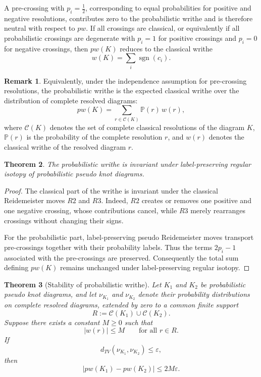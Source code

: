 \documentclass[a4paper, reqno, 12pt]{amsart}
\theoremstyle{plain}
\newtheorem{theorem}{Theorem}[section]
\theoremstyle{definition}
\newtheorem{remark}[theorem]{Remark}
\begin{document}
A pre-crossing with \(p_i=\frac12\), corresponding to equal probabilities for positive and negative resolutions, contributes zero to the probabilistic writhe and is therefore neutral with respect to \(pw\). If all crossings are classical, or equivalently if all probabilistic crossings are degenerate with \(p_i=1\) for positive crossings and \(p_i=0\) for negative crossings, then \(pw(K)\) reduces to the classical writhe
\[
w(K)=\sum_i \operatorname{sgn}(c_i).
\]

\begin{remark}
Equivalently, under the independence assumption for pre-crossing resolutions, the probabilistic writhe is the expected classical writhe over the distribution of complete resolved diagrams:
\[
pw(K)
=
\sum_{r\in\mathcal C(K)}
\mathbb P(r)\,w(r),
\]
where \(\mathcal C(K)\) denotes the set of complete classical resolutions of the diagram \(K\), \(\mathbb P(r)\) is the probability of the complete resolution \(r\), and \(w(r)\) denotes the classical writhe of the resolved diagram \(r\).\end{remark}

\begin{theorem}\label{pwinv}
The probabilistic writhe is invariant under label-preserving regular isotopy of probabilistic pseudo knot diagrams.
\end{theorem}

\begin{proof}
The classical part of the writhe is invariant under the classical Reidemeister moves \(R2\) and \(R3\). Indeed, \(R2\) creates or removes one positive and one negative crossing, whose contributions cancel, while \(R3\) merely rearranges crossings without changing their signs.

For the probabilistic part, label-preserving pseudo Reidemeister moves transport pre-crossings together with their probability labels. Thus the terms \(2p_i-1\) associated with the pre-crossings are preserved. Consequently the total sum defining \(pw(K)\) remains unchanged under label-preserving regular isotopy.
\end{proof}



\begin{theorem}[Stability of probabilistic writhe]
Let \(K_1\) and \(K_2\) be probabilistic pseudo knot diagrams, and let \(\nu_{K_1}\) and \(\nu_{K_2}\) denote their probability distributions on complete resolved diagrams, extended by zero to a common finite support
\[
R:=\mathcal C(K_1)\cup\mathcal C(K_2).
\]
Suppose there exists a constant \(M\ge 0\) such that
\[
|w(r)|\le M
\qquad
\text{for all } r\in R.
\]
If
\[
d_{TV}(\nu_{K_1},\nu_{K_2})\le \varepsilon,
\]
then
\[
|pw(K_1)-pw(K_2)|\le 2M\varepsilon.
\]
\end{theorem}
\end{document}
